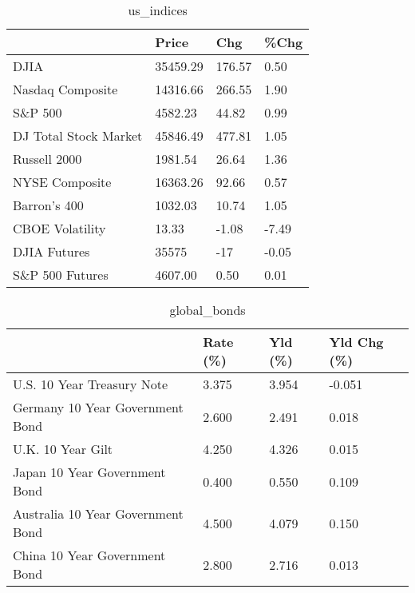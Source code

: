 \documentclass{article}%
\begin{document}
%


\begin{table}[htbp]%
\caption{us\_indices}%
\centering%
\begin{adjustbox}{width=1\textwidth}%
\begin{tabular}{llll}
\toprule
                      &    Price &    Chg &  \%Chg \\
\midrule
                 DJIA & 35459.29 & 176.57 &  0.50 \\
     Nasdaq Composite & 14316.66 & 266.55 &  1.90 \\
              S\&P 500 &  4582.23 &  44.82 &  0.99 \\
DJ Total Stock Market & 45846.49 & 477.81 &  1.05 \\
         Russell 2000 &  1981.54 &  26.64 &  1.36 \\
       NYSE Composite & 16363.26 &  92.66 &  0.57 \\
         Barron's 400 &  1032.03 &  10.74 &  1.05 \\
      CBOE Volatility &    13.33 &  -1.08 & -7.49 \\
         DJIA Futures &    35575 &    -17 & -0.05 \\
      S\&P 500 Futures &  4607.00 &   0.50 &  0.01 \\
\bottomrule
\end{tabular}
%
\end{adjustbox}%
\end{table}

%


\begin{table}[htbp]%
\caption{global\_bonds}%
\centering%
\begin{adjustbox}{width=1\textwidth}%
\begin{tabular}{llll}
\toprule
                                  & Rate (\%) & Yld (\%) & Yld Chg (\%) \\
\midrule
       U.S. 10 Year Treasury Note &    3.375 &   3.954 &      -0.051 \\
  Germany 10 Year Government Bond &    2.600 &   2.491 &       0.018 \\
                U.K. 10 Year Gilt &    4.250 &   4.326 &       0.015 \\
    Japan 10 Year Government Bond &    0.400 &   0.550 &       0.109 \\
Australia 10 Year Government Bond &    4.500 &   4.079 &       0.150 \\
    China 10 Year Government Bond &    2.800 &   2.716 &       0.013 \\
\bottomrule
\end{tabular}
%
\end{adjustbox}%
\end{table}
\end{document}
